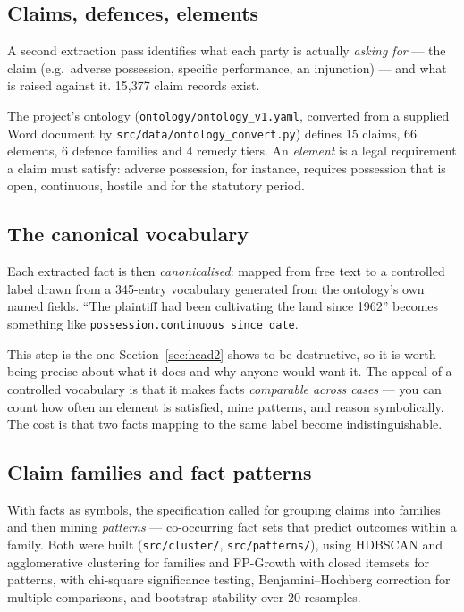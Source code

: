 \documentclass[12pt,a4paper]{article}
\newcommand{\code}[1]{\texttt{\small #1}}
\begin{document}
\subsection{Claims, defences, elements}

A second extraction pass identifies what each party is actually \emph{asking for} --- the claim
(e.g.\ adverse possession, specific performance, an injunction) --- and what is raised against it.
15,377 claim records exist.

The project's ontology (\code{ontology/ontology\_v1.yaml}, converted from a supplied Word document
by \code{src/data/ontology\_convert.py}) defines 15 claims, 66 elements, 6 defence families and 4
remedy tiers. An \emph{element} is a legal requirement a claim must satisfy: adverse possession, for
instance, requires possession that is open, continuous, hostile and for the statutory period.

\subsection{The canonical vocabulary}

Each extracted fact is then \emph{canonicalised}: mapped from free text to a controlled label drawn
from a 345-entry vocabulary generated from the ontology's own named fields. ``The plaintiff had been
cultivating the land since 1962'' becomes something like
\mbox{}\linebreak
\code{possession.continuous\_since\_date}.

This step is the one Section~\ref{sec:head2} shows to be destructive, so it is worth being precise
about what it does and why anyone would want it. The appeal of a controlled vocabulary is that it
makes facts \emph{comparable across cases} --- you can count how often an element is satisfied, mine
patterns, and reason symbolically. The cost is that two facts mapping to the same label become
indistinguishable.

\subsection{Claim families and fact patterns}

With facts as symbols, the specification called for grouping claims into families and then mining
\emph{patterns} --- co-occurring fact sets that predict outcomes within a family. Both were built
(\code{src/cluster/}, \code{src/patterns/}), using HDBSCAN and agglomerative clustering for
families and FP-Growth with closed itemsets for patterns, with chi-square significance testing,
Benjamini--Hochberg correction for multiple comparisons, and bootstrap stability over 20 resamples.
\end{document}
